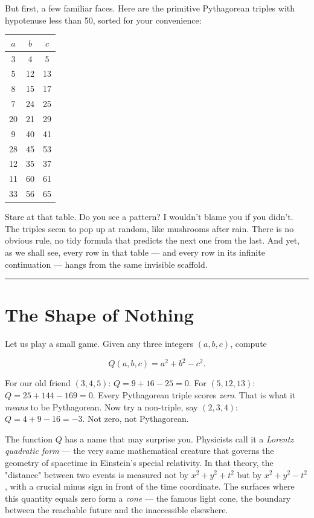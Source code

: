 \documentclass[12pt, letterpaper, openany]{book}
\theoremstyle{definition}
\theoremstyle{remark}
\begin{document}
But first, a few familiar faces. Here are the primitive Pythagorean triples with hypotenuse less than 50, sorted for your convenience:


\begin{center}
\begin{tabular}{|c|c|c|}
\hline
$a$ & $b$ & $c$ \\
\hline
3 & 4 & 5 \\
5 & 12 & 13 \\
8 & 15 & 17 \\
7 & 24 & 25 \\
20 & 21 & 29 \\
9 & 40 & 41 \\
28 & 45 & 53 \\
12 & 35 & 37 \\
11 & 60 & 61 \\
33 & 56 & 65 \\
\hline
\end{tabular}
\end{center}


Stare at that table. Do you see a pattern? I wouldn't blame you if you didn't. The triples seem to pop up at random, like mushrooms after rain. There is no obvious rule, no tidy formula that predicts the next one from the last. And yet, as we shall see, every row in that table --- and every row in its infinite continuation --- hangs from the same invisible scaffold.


\bigskip\noindent\rule{\textwidth}{0.4pt}\bigskip



\section*{The Shape of Nothing}


Let us play a small game. Given any three integers $(a, b, c)$, compute

\[
Q(a, b, c) = a^2 + b^2 - c^2.
\]

For our old friend $(3, 4, 5)$: $Q = 9 + 16 - 25 = 0$. For $(5, 12, 13)$: $Q = 25 + 144 - 169 = 0$. Every Pythagorean triple scores \textit{zero}. That is what it \textit{means} to be Pythagorean. Now try a non-triple, say $(2, 3, 4)$: $Q = 4 + 9 - 16 = -3$. Not zero, not Pythagorean.

The function $Q$ has a name that may surprise you. Physicists call it a \textit{Lorentz quadratic form} --- the very same mathematical creature that governs the geometry of spacetime in Einstein's special relativity. In that theory, the "distance" between two events is measured not by $x^2 + y^2 + t^2$ but by $x^2 + y^2 - t^2$, with a crucial minus sign in front of the time coordinate. The surfaces where this quantity equals zero form a \textit{cone} --- the famous light cone, the boundary between the reachable future and the inaccessible elsewhere.
\end{document}
